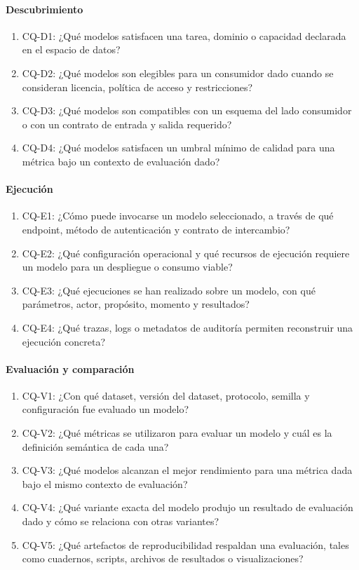 \documentclass[11pt,a4paper]{article}
\newcommand{\cq}[1]{\textsf{#1}}
\begin{document}
\paragraph{Descubrimiento}
\begin{enumerate}[label=\arabic*., leftmargin=*]
\item \cq{CQ-D1}: ¿Qué modelos satisfacen una tarea, dominio o capacidad declarada en el espacio de datos?
\item \cq{CQ-D2}: ¿Qué modelos son elegibles para un consumidor dado cuando se consideran licencia, política de acceso y restricciones?
\item \cq{CQ-D3}: ¿Qué modelos son compatibles con un esquema del lado consumidor o con un contrato de entrada y salida requerido?
\item \cq{CQ-D4}: ¿Qué modelos satisfacen un umbral mínimo de calidad para una métrica bajo un contexto de evaluación dado?
\end{enumerate}

\paragraph{Ejecución}
\begin{enumerate}[label=\arabic*., leftmargin=*]
\item \cq{CQ-E1}: ¿Cómo puede invocarse un modelo seleccionado, a través de qué endpoint, método de autenticación y contrato de intercambio?
\item \cq{CQ-E2}: ¿Qué configuración operacional y qué recursos de ejecución requiere un modelo para un despliegue o consumo viable?
\item \cq{CQ-E3}: ¿Qué ejecuciones se han realizado sobre un modelo, con qué parámetros, actor, propósito, momento y resultados?
\item \cq{CQ-E4}: ¿Qué trazas, logs o metadatos de auditoría permiten reconstruir una ejecución concreta?
\end{enumerate}

\paragraph{Evaluación y comparación}
\begin{enumerate}[label=\arabic*., leftmargin=*]
\item \cq{CQ-V1}: ¿Con qué dataset, versión del dataset, protocolo, semilla y configuración fue evaluado un modelo?
\item \cq{CQ-V2}: ¿Qué métricas se utilizaron para evaluar un modelo y cuál es la definición semántica de cada una?
\item \cq{CQ-V3}: ¿Qué modelos alcanzan el mejor rendimiento para una métrica dada bajo el mismo contexto de evaluación?
\item \cq{CQ-V4}: ¿Qué variante exacta del modelo produjo un resultado de evaluación dado y cómo se relaciona con otras variantes?
\item \cq{CQ-V5}: ¿Qué artefactos de reproducibilidad respaldan una evaluación, tales como cuadernos, scripts, archivos de resultados o visualizaciones?
\end{enumerate}
\end{document}

